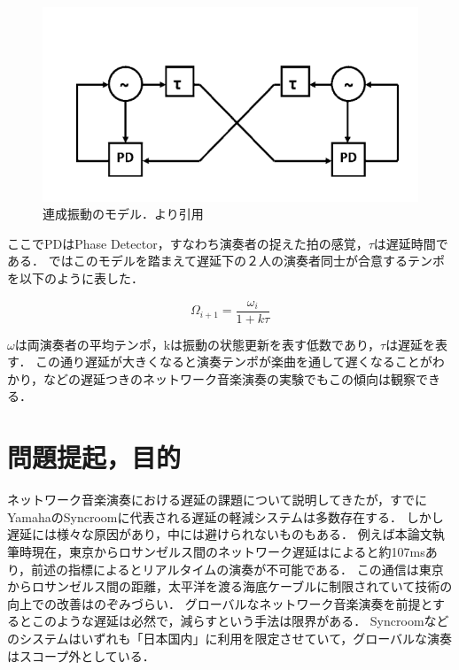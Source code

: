 \begin{figure}
  \centering
  \includegraphics[width=0.8\linewidth]{src/latencymodel.png}
  \caption{連成振動のモデル．\cite{latency:model}より引用}
  \label{fig:oscillator}
\end{figure}

ここでPDはPhase Detector，すなわち演奏者の捉えた拍の感覚，\begin{math}\tau\end{math}は遅延時間である．
\cite{latency:model}\cite{nmp:overview}ではこのモデルを踏まえて遅延下の２人の演奏者同士が合意するテンポを以下のように表した．

\begin{displaymath}
  \Omega_{i+1} = \frac{\omega_i }{1 + k\tau}
\end{displaymath}

\begin{math}\omega \end{math}は両演奏者の平均テンポ，kは振動の状態更新を表す低数であり，\begin{math}\tau \end{math}は遅延を表す．
この通り遅延が大きくなると演奏テンポが楽曲を通して遅くなることがわかり，\cite{latency:ipsj}などの遅延つきのネットワーク音楽演奏の実験でもこの傾向は観察できる．

\section{問題提起，目的}
ネットワーク音楽演奏における遅延の課題について説明してきたが，すでにYamahaのSyncroom\cite{syncroom}に代表される遅延の軽減システムは多数存在する．
しかし遅延には様々な原因\cite{nmp:overview}があり，中には避けられないものもある．
例えば本論文執筆時現在，東京からロサンゼルス間のネットワーク遅延は\cite{wondernetwork}によると約107msあり，前述の指標によるとリアルタイムの演奏が不可能である．
この通信は東京からロサンゼルス間の距離，太平洋を渡る海底ケーブルに制限されていて技術の向上での改善はのぞみづらい．
グローバルなネットワーク音楽演奏を前提とするとこのような遅延は必然で，減らすという手法は限界がある．
Syncroomなどのシステムはいずれも「日本国内」に利用を限定させていて，グローバルな演奏はスコープ外としている．

